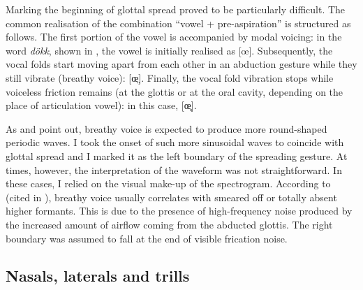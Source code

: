 \documentclass[11pt,a4paper,openany]{memoir}\usepackage[]{graphicx}\usepackage[]{color}
\begin{document}
Marking the beginning of glottal spread proved to be particularly difficult.
The common realisation of the combination ``vowel + pre-aspiration'' is structured as follows.
The first portion of the vowel is accompanied by modal voicing: in the word \textit{dökk}, shown in , the vowel is initially realised as [œ].
Subsequently, the vocal folds start moving apart from each other in an abduction gesture while they still vibrate (breathy voice): [œ̤].
Finally, the vocal fold vibration stops while voiceless friction remains (at the glottis or at the oral cavity, depending on the place of articulation vowel): in this case, [œ̥].

As \citet{khan2012} and \citet{nance2013} point out, breathy voice is expected to produce more round-shaped periodic waves.
I took the onset of such more sinusoidal waves to coincide with glottal spread and I marked it as the left boundary of the spreading gesture.
At times, however, the interpretation of the waveform was not straightforward.
In these cases, I relied on the visual make-up of the spectrogram.
According to \citealt{jones2006} (cited in \citealt[134]{nance2013}), breathy voice usually correlates with smeared off or totally absent higher formants.
This is due to the presence of high-frequency noise produced by the increased amount of airflow coming from the abducted glottis.
The right boundary was assumed to fall at the end of visible frication noise.

\subsection{Nasals, laterals and trills}
\end{document}

